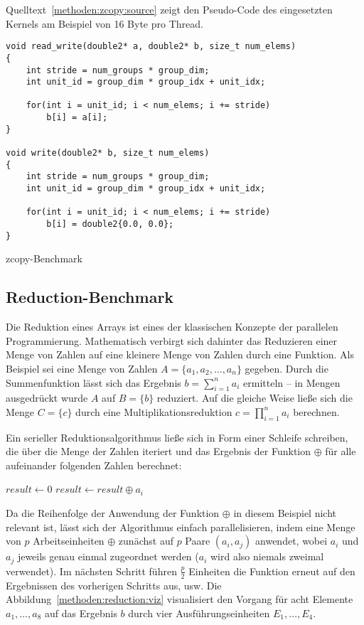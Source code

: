 Quelltext~\ref{methoden:zcopy:source} zeigt den Pseudo-Code des eingesetzten
Kernels am Beispiel von 16 Byte pro Thread.

\begin{code}
    \begin{verbatim}
void read_write(double2* a, double2* b, size_t num_elems)
{
    int stride = num_groups * group_dim;
    int unit_id = group_dim * group_idx + unit_idx;

    for(int i = unit_id; i < num_elems; i += stride)
        b[i] = a[i];
}

void write(double2* b, size_t num_elems)
{
    int stride = num_groups * group_dim;
    int unit_id = group_dim * group_idx + unit_idx;

    for(int i = unit_id; i < num_elems; i += stride)
        b[i] = double2{0.0, 0.0};
}
    \end{verbatim}
    \caption{zcopy-Benchmark}
    \label{methoden:zcopy:source}
\end{code}

\subsection{Reduction-Benchmark}
\label{methoden:reduction}

Die Reduktion eines Arrays ist eines der klassischen Konzepte der parallelen
Programmierung. Mathematisch verbirgt sich dahinter das Reduzieren einer Menge
von Zahlen auf eine kleinere Menge von Zahlen durch eine Funktion. Als Beispiel
sei eine Menge von Zahlen $A = \{a_1, a_2, \dots, a_n\}$ gegeben. Durch die
Summenfunktion lässt sich das Ergebnis $b = \sum\limits_{i = 1}^n a_i$
ermitteln -- in Mengen ausgedrückt wurde $A$ auf $B = \{b\}$ reduziert. Auf
die gleiche Weise ließe sich die Menge $C = \{c\}$ durch eine
Multiplikationsreduktion $c = \prod\limits_{i = 1}^n a_i$ berechnen.

Ein serieller Reduktionsalgorithmus ließe sich in Form einer Schleife schreiben,
die über die Menge der Zahlen iteriert und das Ergebnis der Funktion $\oplus$
für alle aufeinander folgenden Zahlen berechnet:

\begin{algorithmic}[1]
\State $result \gets 0$
    \State $result \gets result \oplus a_i$
\EndFor
\end{algorithmic}

Da die Reihenfolge der Anwendung der Funktion $\oplus$ in diesem Beispiel nicht
relevant ist, lässt sich der Algorithmus einfach parallelisieren, indem eine
Menge von $p$ Arbeitseinheiten $\oplus$ zunächst auf $p$ Paare $(a_i, a_j)$
anwendet, wobei $a_i$ und $a_j$ jeweils genau einmal zugeordnet werden ($a_i$
wird also niemals zweimal verwendet). Im nächsten Schritt führen
$\frac{p}{2}$ Einheiten die Funktion erneut auf den Ergebnissen des vorherigen
Schritts aus, usw. Die Abbildung~\ref{methoden:reduction:viz} visualisiert
den Vorgang für acht Elemente $a_1, \dots, a_8$ auf das Ergebnis $b$ durch vier
Ausführungseinheiten $E_1, \dots, E_4$.

